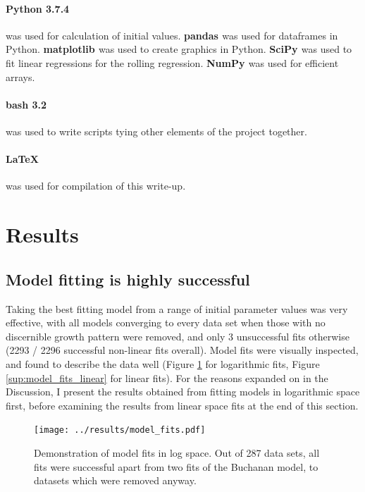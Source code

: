 \documentclass[11pt, a4paper]{article}
\begin{document}
\begin{linenumbers}
\paragraph{Python 3.7.4 \cite{python}} was used for calculation of initial values. \textbf{pandas \cite{pd}} was used for dataframes in Python. \textbf{matplotlib \cite{plt}} was used to create graphics in Python. \textbf{SciPy \cite{numpy}} was used to fit linear regressions for the rolling regression. \textbf{NumPy \cite{numpy}} was used for efficient arrays.

\paragraph{bash 3.2} was used to write scripts tying other elements of the project together.

\paragraph{\LaTeX } was used for compilation of this write-up.
\section{Results}

\subsection{Model fitting is highly successful}
Taking the best fitting model from a range of initial parameter values was very effective, with all models converging to every data set when those with no discernible growth pattern were removed, and only 3 unsuccessful fits otherwise (2293 / 2296 successful non-linear fits overall). Model fits were visually inspected, and found to describe the data well (Figure \ref{fig:model_fits} for logarithmic fits, Figure \ref{sup:model_fits_linear} for linear fits). For the reasons expanded on in the Discussion, I present the results obtained from fitting models in logarithmic space first, before examining the results from linear space fits at the end of this section.

                \begin{figure}[H]
                \centering
        \texttt{[image: ../results/model\_fits.pdf]}
        \caption{Demonstration of model fits in log space. Out of 287 data sets, all fits were successful apart from two fits of the Buchanan model, to datasets which were removed anyway. }
        \label{fig:model_fits}
        \end{figure}


\end{linenumbers}
\end{document}
